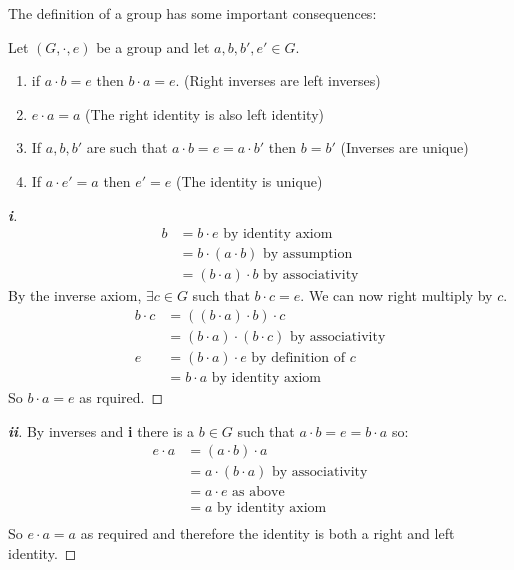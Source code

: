 \documentclass[../main.tex]{subfiles}
\begin{document}
The definition of a group has some important consequences:
\begin{proposition}
  Let $(G, \cdot, e)$ be a group and let $a, b, b', e' \in G$.
  \begin{enumerate}
    \item if $a \cdot b = e$ then $b \cdot a = e$. (Right inverses are left inverses)
    \item $e \cdot a = a$ (The right identity is also left identity)
    \item If $a, b, b'$ are such that $a \cdot b = e = a \cdot b'$ then $b = b'$ (Inverses are unique)
    \item If $a \cdot e' = a$ then $e' = e$ (The identity is unique)
  \end{enumerate}
  \label{groupProp}
\end{proposition}
\begin{proof}[\textbf{i}]
 \begin{align*}
   b &= b \cdot e \text{ by identity axiom} \\
     &= b \cdot (a \cdot b) \text{ by assumption} \\
     &= (b \cdot a) \cdot b \text{ by associativity}
 \end{align*}
 By the inverse axiom, $\exists c \in G$ such that $b \cdot c = e$.
 We can now right multiply by $c$.
 \begin{align*}
  b \cdot c &= ((b \cdot a) \cdot b) \cdot c \\
            &= (b \cdot a) \cdot (b \cdot c) \text{ by associativity} \\
          e &= (b \cdot a) \cdot e \text{ by definition of $c$} \\
            &= b \cdot a \text{ by identity axiom}
 \end{align*}
 So $b \cdot a = e$ as rquired.
\end{proof}
\begin{proof}[\textbf{ii}]
  By inverses and \textbf{i} there is a $b \in G$ such that $a \cdot b = e = b \cdot a$ so:
  \begin{align*}
    e \cdot a &= (a \cdot b) \cdot a \\
              &= a \cdot (b \cdot a) \text{ by associativity} \\
              &= a \cdot e \text{ as above} \\
              &= a \text{ by identity axiom} \\
  \end{align*}
  So $e \cdot a = a$ as required and therefore the identity is both a right and left identity.
\end{proof}
\end{document}

